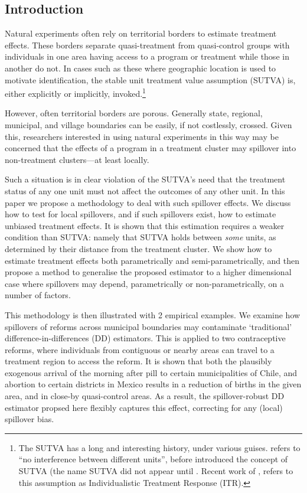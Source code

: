 \documentclass{article}
\begin{document}
\newpage
\begin{spacing}{1.1}
\section{Introduction}
Natural experiments often rely on territorial borders to estimate treatment 
effects.  These borders separate quasi-treatment from quasi-control groups with
individuals in one area having access to a program or treatment while those in 
another do not.  In cases such as these where geographic location is used to 
motivate identification, the stable unit treatment value assumption (SUTVA) is, 
either explicitly or implicitly, invoked.\footnote{The SUTVA has a long and 
interesting history, under various guises. \citet{Cox1958} refers to ``no 
interference between different units'', before \citet{Rubin1978} introduced the 
concept of SUTVA (the name SUTVA did not appear until \citet{Rubin1980}.  Recent 
work of \citet{Manski2013}, refers to this assumption as Individualistic 
Treatment Response (ITR).}

However, often territorial borders are porous.  Generally state, regional,
municipal, and village boundaries can be easily, if not costlessly, crossed.
Given this, researchers interested in using natural experiments in this way may
be concerned that the effects of a program in a treatment cluster may spillover 
into non-treatment clusters---at least locally.

Such a situation is in clear violation of the SUTVA's need that the treatment
status of any one unit must not affect the outcomes of any other unit.  In this 
paper we propose a methodology to deal with such spillover effects.  We
discuss how to test for local spillovers, and if such spillovers exist, how to 
estimate unbiased treatment effects.  It is shown that this estimation requires
a weaker condition than SUTVA: namely that SUTVA holds between \emph{some} units, 
as determined by their distance from the treatment cluster.  We show how to 
estimate treatment effects both parametrically and semi-parametrically, and then
propose a method to generalise the proposed estimator to a higher dimensional 
case where spillovers may depend, parametrically or non-parametrically, on a number 
of factors.

This methodology is then illustrated with 2 empirical examples.  We examine how
spillovers of reforms across municipal boundaries may contaminate `traditional' 
difference-in-differences (DD) estimators.  This is applied to two contraceptive
reforms, where individuals from contiguous or nearby areas can travel to a 
treatment region to access the reform.  It is shown that both the plausibly 
exogenous arrival of the morning after pill to certain municipalities of Chile, 
and abortion to certain districts in Mexico results in a reduction of births
in the given area, and in close-by quasi-control areas.  As a result, the
spillover-robust DD estimator propsed here flexibly captures this effect, 
correcting for any (local) spillover bias.


\end{spacing}
\end{document}
